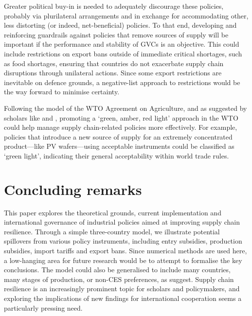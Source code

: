 \documentclass{article}
\begin{document}
Greater political buy-in is needed to adequately discourage these policies, probably via plurilateral arrangements and in exchange for accommodating other, less distorting (or indeed, net-beneficial) policies. To that end, developing and reinforcing guardrails against policies that remove sources of supply will be important if the performance and stability of GVCs is an objective. This could include restrictions on export bans outside of immediate critical shortages, such as food shortages, ensuring that countries do not exacerbate supply chain disruptions through unilateral actions. Since some export restrictions are inevitable on defence grounds, a negative-list approach to restrictions would be the way forward to minimise certainty.

Following the model of the WTO Agreement on Agriculture, and as suggested by scholars like \textcite{aguayo_ayala_preserving_2005} and \textcite{bown_wtoing_2019}, promoting a `green, amber, red light' approach in the WTO could help manage supply chain-related policies more effectively. For example, policies that introduce a new source of supply for an extremely concentrated product---like PV wafers---using acceptable instruments could be classified as `green light', indicating their general acceptability within world trade rules.

\section{Concluding remarks}

This paper explores the theoretical grounds, current implementation and international governance of industrial policies aimed at improving supply chain resilience. Through a simple three-country model, we illustrate potential spillovers from various policy instruments, including entry subsidies, production subsidies, import tariffs and export bans. Since numerical methods are used here, a low-hanging area for future research would be to attempt to formalise the key conclusions. The model could also be generalised to include many countries, many stages of production, or non-CES preferences, as \textcite{grossman_supply_2023} suggest. Supply chain resilience is an increasingly prominent topic for scholars and policymakers, and exploring the implications of new findings for international cooperation seems a particularly pressing need.

\nocite{dcceew_department_of_climate_change_energy_the_environment_and_water_securing_2022}

\printbibliography
\end{document}
